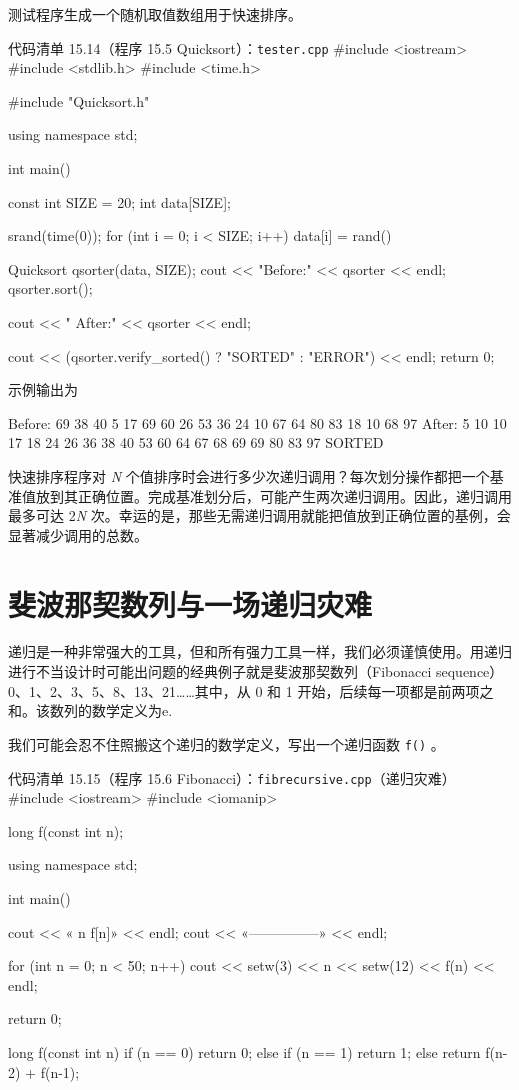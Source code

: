 测试程序生成一个随机取值数组用于快速排序。

\begin{codeboxt}{代码清单 15.14（程序 15.5 Quicksort）：\texttt{tester.\allowbreak{}cpp}}
#include <iostream>
#include <stdlib.h>
#include <time.h>

#include "Quicksort.h"

using namespace std;

int main()
{
    const int SIZE = 20;
    int data[SIZE];

    srand(time(0));
    for (int i = 0; i < SIZE; i++) data[i] = rand()%

    Quicksort qsorter(data, SIZE);
    cout << "Before:" << qsorter << endl;
    qsorter.sort();

    cout << " After:" << qsorter << endl;

    cout << (qsorter.verify_sorted() ? "SORTED" : "ERROR") << endl;
    return 0;
}
\end{codeboxt}

示例输出为

\begin{codebox}
Before: 69 38 40  5 17 69 60 26 53 36 24 10 67 64 80 83 18 10 68 97
 After:  5 10 10 17 18 24 26 36 38 40 53 60 64 67 68 69 69 80 83 97
SORTED
\end{codebox}

快速排序程序对 \emph{N} 个值排序时会进行多少次递归调用？每次划分操作都把一个基准值放到其正确位置。完成基准划分后，可能产生两次递归调用。因此，递归调用最多可达 2\emph{N} 次。幸运的是，那些无需递归调用就能把值放到正确位置的基例，会显著减少调用的总数。

\section{斐波那契数列与一场递归灾难}

递归是一种非常强大的工具，但和所有强力工具一样，我们必须谨慎使用。用递归进行不当设计时可能出问题的经典例子就是斐波那契数列（Fibonacci sequence）0、1、2、3、5、8、13、21……其中，从 0 和 1 开始，后续每一项都是前两项之和。该数列的数学定义为e.


我们可能会忍不住照搬这个递归的数学定义，写出一个递归函数 \texttt{f()} 。

\begin{codeboxt}{代码清单 15.15（程序 15.6 Fibonacci）：\texttt{fibrecursive.\allowbreak{}cpp}（递归灾难）}
#include <iostream>
#include <iomanip>

long f(const int n);

using namespace std;

int main()
{
    cout << «  n        f[n]» << endl;
    cout << «---------------» << endl;

    for (int n = 0; n < 50; n++)
    {
        cout << setw(3) << n << setw(12) << f(n) << endl;
    }

    return 0;
}

long f(const int n)
{
    if      (n == 0) return 0;
    else if (n == 1) return 1;
    else             return f(n-2) + f(n-1);
}
\end{codeboxt}

